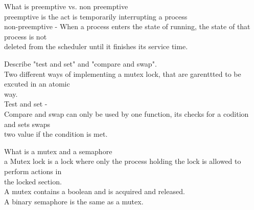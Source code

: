 \documentclass[a4paper,10pt,titlepage]{report}
\begin{document}
What is preemptive vs. non preemptive \\

\hspace{10mm}  preemptive is the act is  temporarily interrupting a process\\

\hspace{10mm}  non-preemptive -  When a process enters the state of running, the state of that process is not \\ \hspace{10mm} deleted from the scheduler until it finishes its service time.\\
\vspace{5mm}


Describe "test and set" and "compare and swap". \\

\hspace{10mm}  Two different ways of implementing a mutex lock, that are garenttted to be excuted in an atomic \\ \hspace{10mm} way.\\

\hspace{10mm} Test and set - \\

\hspace{10mm}  Compare and swap can only be used by one function, its checks for a codition and sets swaps \\ \hspace{10mm}  two value if the condition is met.\\ 
\vspace{5mm}



What is a mutex and a semaphore \\

\hspace{10mm}  a Mutex lock is a lock where only the process holding the lock is allowed to perform actions in \\ \hspace{10mm}  	the locked section. \\
\hspace{10mm}  A mutex contains a boolean and is acquired and released.\\


\hspace{10mm}  A binary semaphore is the same as a mutex. \\
\end{document}
